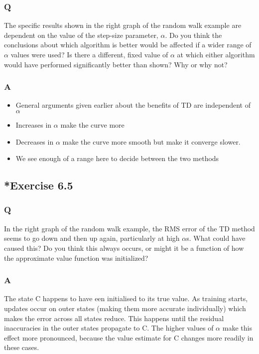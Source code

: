 \subsubsection{Q}
The specific results shown in the right graph of the random walk example are dependent on the value of the step-size parameter, $\alpha$. Do you think the conclusions about which algorithm is better would be affected if a wider range of $\alpha$ values were used? Is there a different, fixed value of $\alpha$ at which either algorithm would have performed significantly better than shown? Why or why not?
\subsubsection{A}

\begin{itemize}
    \item General arguments given earlier about the benefits of TD are independent of $\alpha$
    \item Increases in $\alpha$ make the curve more 
    \item Decreases in $\alpha$ make the curve more smooth but make it converge slower.
    \item We see enough of a range here to decide between the two methods
\end{itemize}

\subsection{*Exercise 6.5}
\subsubsection{Q}
In the right graph of the random walk example, the RMS error of the TD method seems to go down and then up again, particularly at high $\alpha$s. What could have caused this? Do you think this always occurs, or might it be a function of how the approximate value function was initialized?
\subsubsection{A}
The state C happens to have een initialised to its true value. As training starts, updates occur on outer states (making them more accurate individually) which makes the error across all states reduce. This happens until the residual inaccuracies in the outer states propagate to C. The higher values of $\alpha$ make this effect more pronounced, because the value estimate for C changes more readily in these cases.

